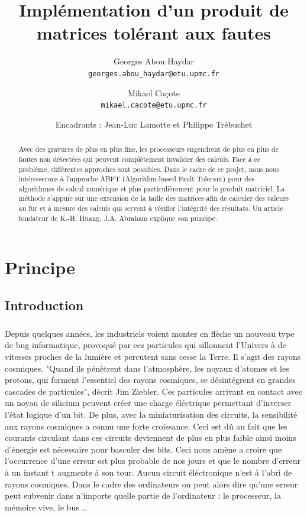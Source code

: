 \documentclass[a4paper, 10pt]{report}
\begin{document}
\title{Implémentation d'un produit de matrices tolérant aux fautes}
\author{
Georges Abou Haydar\\\texttt{georges.abou\_haydar@etu.upmc.fr}
\and Mikael Caçote\\\texttt{mikael.cacote@etu.upmc.fr}
\and Encadrants : Jean-Luc Lamotte et Philippe Trébuchet
}
\maketitle

\begin{abstract}
Avec des gravures de plus en plus fine, les processeurs engendrent de plus en plus de fautes 
non détectées qui peuvent complètement invalider des calculs. Face à ce problème, différentes 
approches sont possibles. Dans le cadre de ce projet, nous nous intéresserons à l'approche ABFT 
(Algorithm-based Fault Tolerant) pour des algorithmes de calcul numérique et plus particulièrement 
pour le produit matriciel. La méthode s'appuie sur une extension de la taille des matrices afin de 
calculer des valeurs au fur et à mesure des calculs qui servent à vérifier l'intégrité des résultats. 
Un article fondateur de K.-H. Huang, J.A. Abraham \cite{Huang} explique son principe. 
\end{abstract}

\tableofcontents

\chapter{Principe}
\label{chap:Principe}
\section{Introduction}
\paragraph*{}
Depuis quelques années, les industriels voient monter en flèche un nouveau type de bug informatique,
provoqué par ces particules qui sillonnent l’Univers à de vitesses proches de la lumière et percutent sans
cesse la Terre. Il s'agit des rayons cosmiques.\newline
"Quand ils pénètrent dans l’atmosphère, les noyaux d’atomes et les protons, qui forment l’essentiel des
 rayons cosmiques, se désintégrent en grandes cascades de particules", décrit Jim Ziebler. Ces particules
 arrivant en contact avec un noyau de silicium peuvent créer une charge éléctrique permettant
d'inverser l'état logique d'un bit.\newline
De plus, avec la miniaturisation des circuits, la sensibilité aux rayons cosmiques a connu une forte 
croissance. Ceci est dû au fait que les courants circulant dans ces circuits deviennent de plus en plus 
faible ainsi moins d'énergie est nécessaire pour basculer des bits.
Ceci nous amène a croire que l'occurrence d'une erreur est plus probable de nos jours et que le nombre 
d'erreur à un instant t augmente à son tour.\newline 
Aucun circuit éléctronique n'est à l'abri de rayons cosmiques. Dans le cadre des ordinateurs on peut alors 
dire qu'une erreur peut subvenir dans n'importe quelle partie de l'ordinateur : le processeur, la mémoire 
vive, le bus \ldots
\end{document}
